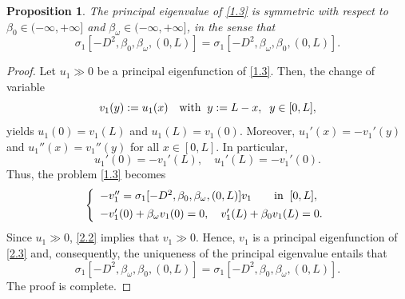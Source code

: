 \documentclass[10pt,a4paper]{amsart}
\newtheorem{proposition}{Proposition}
\def\b{\beta}
\def\o{\omega}
\def\s{\sigma}
\begin{document}
\begin{proposition}
\label{pr2.3}
The principal eigenvalue of \eqref{1.3} is symmetric with respect to $\b_0\in(-\infty,+\infty]$ and $\b_\o\in(-\infty,+\infty]$, in the sense that
$$
\s_1[-D^2,\b_0,\b_\o,(0,L)] = \s_1[-D^2,\b_\o,\b_0,(0,L)].
$$
\end{proposition}

\begin{proof}
Let $u_1 \gg 0$ be a principal eigenfunction of \eqref{1.3}. Then, the change of variable
\begin{equation}
\label{2.2}
 v_1(y):= u_1(x) \quad \hbox{with} \; \; y := L-x, \; \; y \in [0,L],
\end{equation}
yields $u_1(0) = v_1(L)$ and $u_1(L) = v_1(0)$. Moreover, $u_1'(x) = -v_1'(y)$ and $u_1''(x) = v_1''(y)$ for all $x\in [0,L]$. In particular,
$$
  u_1'(0) = -v_1'(L),\quad u_1'(L) = -v_1'(0).
$$
Thus, the problem \eqref{1.3} becomes
\begin{equation}
\label{2.3}
	\left \{ \begin{array}{ll}
		-v_1''=\s_1[-D^2, \b_0 ,\b_\o,(0,L)] v_1  \qquad  \hbox{in} \;\; [0,L],\\[1ex]
		-v_1'(0)+\b_\o v_1(0)= 0, \quad  v_1'(L)+\b_0 v_1(L)  = 0. \end{array} \right.
\end{equation}
Since $u_1 \gg 0$, \eqref{2.2} implies that $v_1 \gg 0$. Hence, $v_1$ is a principal eigenfunction of \eqref{2.3} and, consequently, the uniqueness of the principal eigenvalue entails that
$$
\s_1[-D^2,\b_\o,\b_0,(0,L)] = \s_1[-D^2,\b_0,\b_\o,(0,L)].
$$
The proof is complete.
\end{proof}
\end{document}
